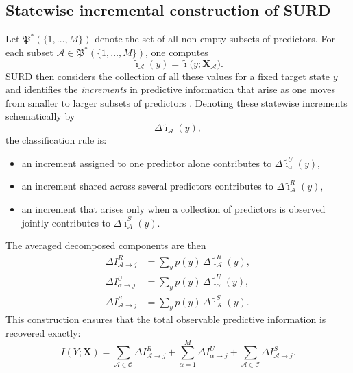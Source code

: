 \documentclass[fleqn,usenatbib]{mnras}
\begin{document}
\subsection{Statewise incremental construction of SURD}

Let \(\mathfrak{P}^\ast(\{1,\dots,M\})\) denote the set of all non-empty subsets of predictors. For each subset \(\mathcal{A}\in \mathfrak{P}^\ast(\{1,\dots,M\})\), one computes
\begin{equation}
\tilde{\imath}_{\mathcal{A}}(y)
=
\tilde{\imath}\bigl(y;\mathbf{X}_{\mathcal{A}}\bigr).
\end{equation}
SURD then considers the collection of all these values for a fixed target state \(y\) and identifies the \emph{increments} in predictive information that arise as one moves from smaller to larger subsets of predictors \cite{MartinezSanchez2024SURD}. Denoting these statewise increments schematically by
\begin{equation}
\Delta \tilde{\imath}_{\mathcal{A}}(y),
\end{equation}
the classification rule is:
\begin{itemize}
    \item an increment assigned to one predictor alone contributes to \(\Delta \tilde{\imath}_{\alpha}^{U}(y)\),
    \item an increment shared across several predictors contributes to \(\Delta \tilde{\imath}_{\mathcal{A}}^{R}(y)\),
    \item an increment that arises only when a collection of predictors is observed jointly contributes to \(\Delta \tilde{\imath}_{\mathcal{A}}^{S}(y)\).
\end{itemize}

The averaged decomposed components are then
\begin{align}
\Delta I_{\mathcal{A}\to j}^{R}
&=
\sum_{y} p(y)\,\Delta \tilde{\imath}_{\mathcal{A}}^{R}(y),\\
\Delta I_{\alpha\to j}^{U}
&=
\sum_{y} p(y)\,\Delta \tilde{\imath}_{\alpha}^{U}(y),\\
\Delta I_{\mathcal{A}\to j}^{S}
&=
\sum_{y} p(y)\,\Delta \tilde{\imath}_{\mathcal{A}}^{S}(y).
\end{align}
This construction ensures that the total observable predictive information is recovered exactly:
\begin{equation}
I(Y;\mathbf{X})
=
\sum_{\mathcal{A}\in\mathcal{C}} \Delta I_{\mathcal{A}\to j}^{R}
+
\sum_{\alpha=1}^{M} \Delta I_{\alpha\to j}^{U}
+
\sum_{\mathcal{A}\in\mathcal{C}} \Delta I_{\mathcal{A}\to j}^{S}.
\label{eq:observable_recovery}
\end{equation}
\end{document}
